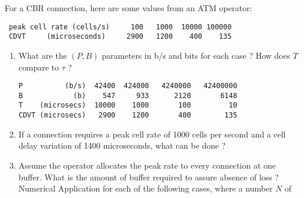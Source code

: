 \begin{problem}
For a CBR connection, here are some values from an ATM operator:
        \begin{verbatim}
 peak cell rate (cells/s)     100   1000  10000 100000
 CDVT     (microseconds)     2900   1200    400    135
        \end{verbatim}
        \begin{enumerate}
                \item What are the $(P, B)$ parameters in b/s and bits for
                each case ?  How does $T$ compare to $\tau$ ?
\ifsol

\begin{verbatim}
P          (b/s)  42400  424000   4240000   42400000
B            (b)    547     933      2120       6148
T    (microsecs)  10000    1000       100         10
CDVT (microsecs)   2900    1200       400        135
\end{verbatim}
\fi
                \item If a connection requires a peak cell rate of 1000 cells
                per second and a cell delay variation of 1400 microseconds,
                what can be done ?
                \item Assume the operator allocates the peak rate to every
                connection at one buffer.  What is the amount of buffer
                required to assure absence of loss ?  Numerical Application
                for each of the following cases, where a number $N$ of

\end{enumerate}
\end{problem}
